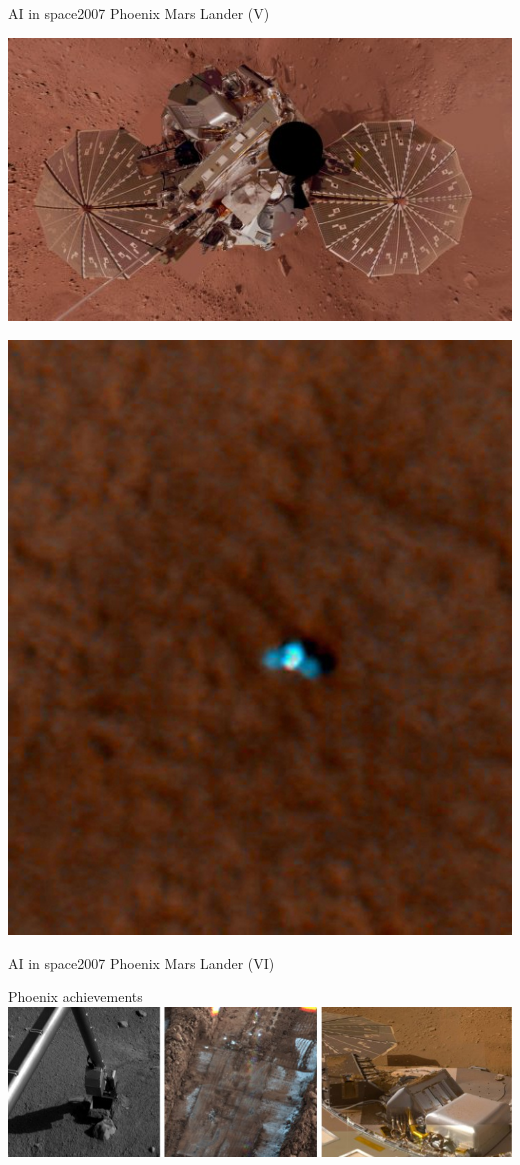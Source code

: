 \documentclass[10pt,compress]{beamer} %
\begin{document}
{	\begin{frame}{AI in space}{2007 Phoenix Mars Lander (V)}
		\vspace{-2cm}
		\begin{center}
			\includegraphics[width=0.8\linewidth]{figs/lander.jpg}
		\end{center}
		\vspace{-6.2cm}
		\includegraphics[width=0.2\linewidth]{figs/mro.jpg}
	\end{frame}

	\begin{frame}{AI in space}{2007 Phoenix Mars Lander (VI)}
		\vspace{-0.2cm}

		\begin{center}
			Phoenix achievements\\
			\includegraphics[width=0.7\linewidth]{figs/logrosPhoenix.jpg}
		\end{center}

		\vspace{-0.5cm}


\end{frame}}
\end{document}
